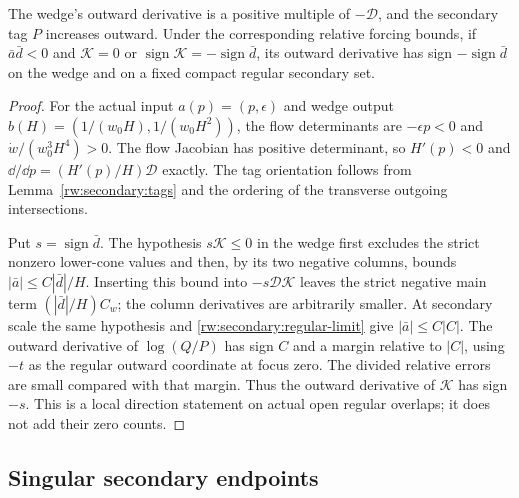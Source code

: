 \begin{lemma}
\label{rw:secondary:chain-direction}
\label{rw:secondary:chain-monotone}
The wedge's outward derivative is a positive multiple of
$-\mathcal D$, and the secondary tag $P$ increases outward.
Under the corresponding relative forcing bounds, if
$\bar a\bar d<0$ and $\mathcal K=0$ or
$\operatorname{sign}\mathcal K=-\operatorname{sign}\bar d$,
its outward derivative has sign $-\operatorname{sign}\bar d$
on the wedge and on a fixed compact regular secondary set.
\end{lemma}

\begin{proof}
For the actual input $a(p)=(p,\epsilon)$ and wedge output
$b(H)=(1/(w_0H),1/(w_0H^2))$, the flow determinants are
$-\epsilon p<0$ and $\dot w/(w_0^3H^4)>0$.
The flow Jacobian has positive determinant, so $H'(p)<0$ and
$\dd/\dd p=(H'(p)/H)\mathcal D$ exactly.
The tag orientation follows from Lemma~\ref{rw:secondary:tags}
and the ordering of the transverse outgoing intersections.

Put $s=\operatorname{sign}\bar d$.
The hypothesis $s\mathcal K\le0$ in the wedge first excludes the
strict nonzero lower-cone values and then, by its two negative
columns, bounds $|\bar a|\le C|\bar d|/H$.
Inserting this bound into $-s\mathcal D\mathcal K$ leaves the
strict negative main term $(|\bar d|/H)C_w$; the column derivatives
are arbitrarily smaller. At secondary scale the same hypothesis
and \eqref{rw:secondary:regular-limit} give $|\bar a|\le C|C|$.
The outward derivative of $\log(Q/P)$ has sign $C$ and a margin
relative to $|C|$, using $-t$ as the regular outward coordinate at
focus zero.
The divided relative errors are small compared with that margin.
Thus the outward derivative of $\mathcal K$ has sign $-s$.
This is a local direction statement on actual open regular overlaps;
it does not add their zero counts.
\end{proof}

\subsection{Singular secondary endpoints}

